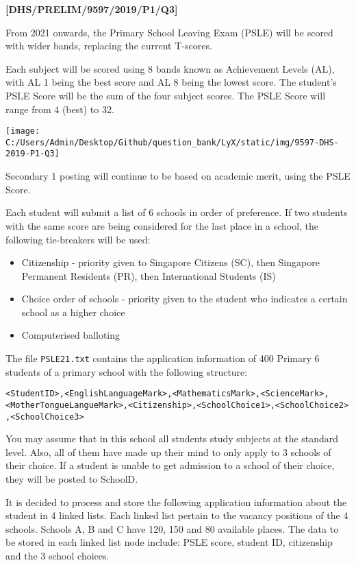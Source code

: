 \item \textbf{{[}DHS/PRELIM/9597/2019/P1/Q3{]} }

From 2021 onwards, the Primary School Leaving Exam (PSLE) will be
scored with wider bands, replacing the current T-scores. 

Each subject will be scored using 8 bands known as Achievement Levels
(AL), with AL 1 being the best score and AL 8 being the lowest score.
The student\textquoteright s PSLE Score will be the sum of the four
subject scores. The PSLE Score will range from 4 (best) to 32. 
\begin{center}
\texttt{[image: C:/Users/Admin/Desktop/Github/question\_bank/LyX/static/img/9597-DHS-2019-P1-Q3]}
\par\end{center}

Secondary 1 posting will continue to be based on academic merit, using
the PSLE Score. 

Each student will submit a list of 6 schools in order of preference.
If two students with the same score are being considered for the last
place in a school, the following tie-breakers will be used: 
\begin{itemize}
\item Citizenship - priority given to Singapore Citizens (SC), then Singapore
Permanent Residents (PR), then International Students (IS) 
\item Choice order of schools - priority given to the student who indicates
a certain school as a higher choice 
\item Computerised balloting 
\end{itemize}
The file \texttt{PSLE21.txt} contains the application information
of 400 Primary 6 students of a primary school with the following structure:

\texttt{<StudentID>,<EnglishLanguageMark>,<MathematicsMark>,<ScienceMark>,<MotherTongueLangueMark>,<Citizenship>,<SchoolChoice1>,<SchoolChoice2>
,<SchoolChoice3> }

You may assume that in this school all students study subjects at
the standard level. Also, all of them have made up their mind to only
apply to 3 schools of their choice. If a student is unable to get
admission to a school of their choice, they will be posted to SchoolD.

It is decided to process and store the following application information
about the student in 4 linked lists. Each linked list pertain to the
vacancy positions of the 4 schools. Schools A, B and C have 120, 150
and 80 available places. The data to be stored in each linked list
node include: PSLE score, student ID, citizenship and the 3 school
choices. 

